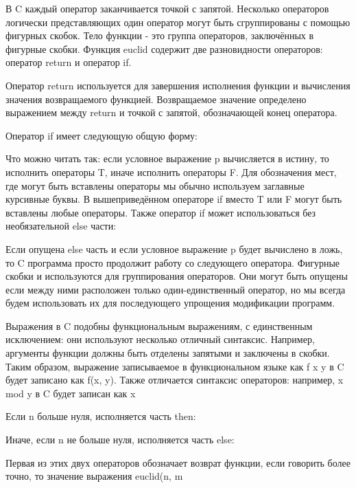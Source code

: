 В C каждый оператор заканчивается точкой с запятой. Несколько операторов логически представляющих один оператор могут быть сгруппированы с помощью фигурных скобок. Тело функции - это группа операторов, заключённых в фигурные скобки. Функция euclid содержит две разновидности операторов: оператор return и оператор if.

Оператор return используется для завершения исполнения функции и вычисления значения возвращаемого функцией. Возвращаемое значение определено выражением между return и точкой с запятой, обозначающей конец оператора.

Оператор if имеет следующую общую форму:

Что можно читать так: если условное выражение p вычисляется в истину, то исполнить операторы T, иначе исполнить операторы F. Для обозначения мест, где могут быть вставлены операторы мы обычно используем заглавные курсивные буквы. В вышеприведённом операторе if вместо T или F могут быть вставлены любые операторы. Также оператор if может использоваться без необязательной else части:

Если опущена else часть и если условное выражение p будет вычислено в ложь, то C программа просто продолжит работу со следующего оператора. Фигурные скобки { и } используются для группирования операторов. Они могут быть опущены если между ними расположен только один-единственный оператор, но мы всегда будем использовать их для последующего упрощения модификации программ. 

Выражения в C подобны функциональным выражениям, с единственным исключением: они используют несколько отличный синтаксис. Например, аргументы функции должны быть отделены запятыми и заключены в скобки. Таким образом, выражение записываемое в функциональном языке как f x y в C будет записано как f(x, y). Также отличается синтаксис операторов: например, x mod y в C будет записан как x%

Если n больше нуля, исполняется часть then:

Иначе, если n не больше нуля, исполняется часть else:

Первая из этих двух операторов обозначает возврат функции, если говорить более точно, то значение выражения euclid(n, m%

